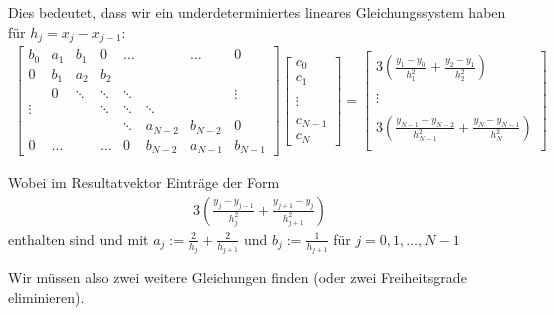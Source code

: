 Dies bedeutet, dass wir ein underdeterminiertes lineares Gleichungssystem haben für $h_j = x_j - x_{j - 1}$:
\rmvspace
\begin{align*}
    \begin{bmatrix}
        b_0    & a_1   & b_1    & 0      & \dots  &           & \dots     & 0         \\
        0      & b_1   & a_2    & b_2    &        &           &           &           \\
               & 0     & \ddots & \ddots & \ddots &           &           & \vdots    \\
        \vdots &       &        & \ddots & \ddots & \ddots    &           &           \\
               &       &        &        & \ddots & a_{N - 2} & b_{N - 2} & 0         \\
        0      & \dots &        & \dots  & 0      & b_{N - 2} & a_{N - 1} & b_{N - 1}
    \end{bmatrix}
    \begin{bmatrix}
        c_0 \\ c_1\\ \\[0.2cm] \vdots \\ \\[0.2cm] c_{N - 1} \\ c_N
    \end{bmatrix}
    =
    \begin{bmatrix}
        3 \left( \frac{y_1 - y_0}{h_1^2} + \frac{y_2 - y_1}{h_2^2} \right)                         \\
        \\ \vdots \\ \\
        3 \left( \frac{y_{N - 1} - y_{N - 2}}{h_{N - 1}^2} + \frac{y_N - y_{N - 1}}{h_N^2} \right) \\
    \end{bmatrix}
\end{align*}

\rmvspace
Wobei im Resultatvektor Einträge der Form
\rmvspace
\begin{align*}
    3 \left( \frac{y_j - y_{j - 1}}{h_j^2} + \frac{y_{j + 1} - y_j}{h^2_{j + 1}} \right)
\end{align*}
enthalten sind und mit $a_j := \frac{2}{h_j} + \frac{2}{h_{j + 1}}$ und $b_j := \frac{1}{h_{j + 1}}$ für $j = 0, 1, \ldots, N - 1$

Wir müssen also zwei weitere Gleichungen finden (oder zwei Freiheitsgrade eliminieren).

